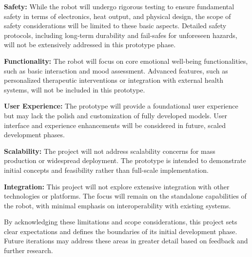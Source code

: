 \textbf{Safety:} While the robot will undergo rigorous testing to ensure fundamental safety in terms of electronics, heat output, and physical design, the scope of safety considerations will be limited to these basic aspects. Detailed safety protocols, including long-term durability and fail-safes for unforeseen hazards, will not be extensively addressed in this prototype phase.

\textbf{Functionality:} The robot will focus on core emotional well-being functionalities, such as basic interaction and mood assessment. Advanced features, such as personalized therapeutic interventions or integration with external health systems, will not be included in this prototype.

\textbf{User Experience:} The prototype will provide a foundational user experience but may lack the polish and customization of fully developed models. User interface and experience enhancements will be considered in future, scaled development phases.

\textbf{Scalability:} The project will not address scalability concerns for mass production or widespread deployment. The prototype is intended to demonstrate initial concepts and feasibility rather than full-scale implementation.

\textbf{Integration:} This project will not explore extensive integration with other technologies or platforms. The focus will remain on the standalone capabilities of the robot, with minimal emphasis on interoperability with existing systems.

By acknowledging these limitations and scope considerations, this project sets clear expectations and defines the boundaries of its initial development phase. Future iterations may address these areas in greater detail based on feedback and further research.

